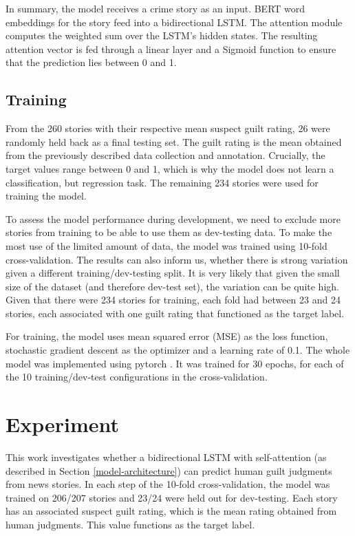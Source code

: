 \documentclass[11pt,a4paper]{article}
\begin{document}
In summary, the model receives a crime story as an input. BERT word embeddings for the story feed into a bidirectional LSTM. The attention module computes the weighted sum over the LSTM's hidden states. The resulting attention vector is fed through a linear layer and a Sigmoid function to ensure that the prediction lies between 0 and 1.

\subsection{Training}

From the 260 stories with their respective mean suspect guilt rating, 26 were randomly held back as a final testing set. The guilt rating is the mean obtained from the previously described data collection and annotation. Crucially, the target values range between 0 and 1, which is why the model does not learn a classification, but regression task. The remaining 234 stories were used for training the model. 

To assess the model performance during development, we need to exclude more stories from training to be able to use them as dev-testing data. To make the most use of the limited amount of data, the model was trained using 10-fold cross-validation. The results can also inform us, whether there is strong variation given a different training/dev-testing split. It is very likely that given the small size of the dataset (and therefore dev-test set), the variation can be quite high. Given that there were 234 stories for training, each fold had between 23 and 24 stories, each associated with one guilt rating that functioned as the target label. 

For training, the model uses mean squared error (MSE) as the loss function, stochastic gradient descent as the optimizer and a learning rate of 0.1. The whole model was implemented using pytorch \citep{Paszke:2017}. It was trained for 30 epochs, for each of the 10 training/dev-test configurations in the cross-validation.

\section{Experiment}

This work investigates whether a bidirectional LSTM with self-attention (as described in Section \ref{model-architecture}) can predict human guilt judgments from news stories. In each step of the 10-fold cross-validation, the model was trained on 206/207 stories and 23/24 were held out for dev-testing. Each story has an associated suspect guilt rating, which is the mean rating obtained from human judgments. This value functions as the target label.
\end{document}
